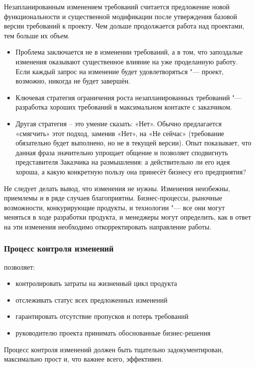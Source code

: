 \documentclass{../industrial-development}
\begin{document}
\lecturenotes

Незапланированным изменением требований считается предложение новой функциональности и существенной модификации после утверждения базовой версии требований к проекту. Чем дольше продолжается работа над проектами, тем больше их объем.
	\begin{itemize}
\item Проблема заключается не в изменении требований, а в том, что запоздалые изменения оказывают существенное влияние на уже проделанную работу. Если каждый запрос на изменение будет удовлетворяться "--- проект, возможно, никогда не будет завершён.
\item Ключевая стратегия ограничения роста незапланированных требований "--- разработка хороших требований в максимальном контакте с заказчиком.
\item Другая стратегия – это умение сказать: «Нет». Обычно предлагается «смягчить» этот подход, заменив «Нет», на «Не сейчас» (требование обязательно будет выполнено, но не в текущей версии). Опыт показывает, что данная фраза значительно упрощает общение и позволяет сподвигнуть представителя Заказчика на размышления: а действительно ли его идея хороша, а какую конкретную пользу она принесёт бизнесу его предприятия?
  	\end{itemize}
Не следует делать вывод, что изменения не нужны. Изменения неизбежны, приемлемы и в ряде случаев благоприятны. Бизнес-процессы, рыночные возможности, конкурирующие продукты, и технологии "--- все они могут меняться в ходе разработки продукта, и менеджеры могут определить, как в ответ на эти изменения необходимо откорректировать направление работы\cite[с.~359]{Wiegers}.



\begin{frame} \frametitle{Процесс контроля изменений}
позволяет:
	\begin{itemize}
\item контролировать затраты на жизненный цикл продукта
\item отслеживать статус всех предложенных изменений
\item гарантировать отсутствие пропусков и потерь требований
\item руководителю проекта принимать обоснованные бизнес-решения
  	\end{itemize}
Процесс контроля изменений должен быть тщательно задокументирован, максимально прост и, что важнее всего, эффективен. 
\end{frame}
\end{document}
